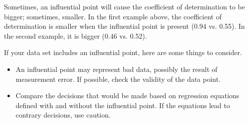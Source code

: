 \documentclass[residuals.tex]{subfiles}
\begin{document}




Sometimes, an influential point will cause the coefficient of determination to be bigger; sometimes, smaller. In the first example above, the coefficient of determination is smaller when the influential point is present (0.94 vs. 0.55). In the second example, it is bigger (0.46 vs. 0.52).

If your data set includes an influential point, here are some things to consider.


\begin{itemize}
\item An influential point may represent bad data, possibly the result of measurement error. If possible, check the validity of the data point.

\item Compare the decisions that would be made based on regression equations defined with and without the influential point. If the equations lead to contrary decisions, use caution.

\end{itemize}
%
%
%
%
%
\end{document}
